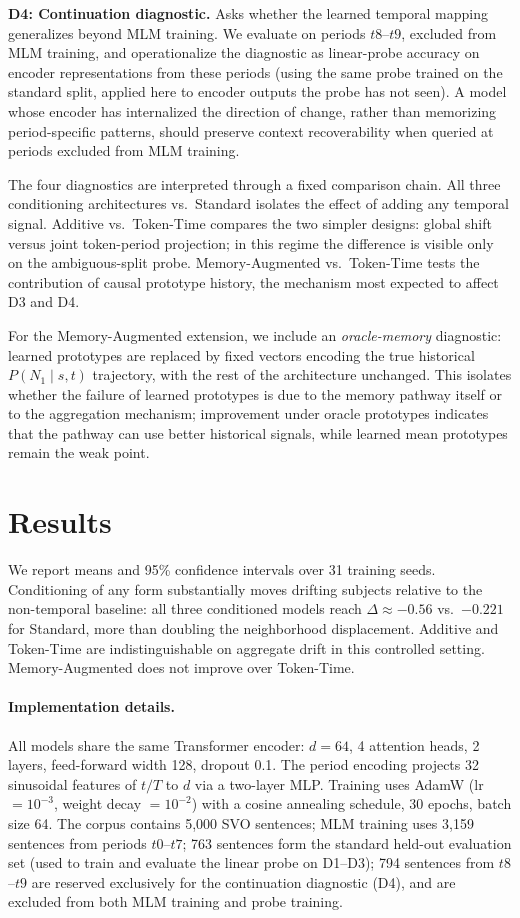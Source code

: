 \documentclass[runningheads]{llncs}
\begin{document}
\textbf{D4: Continuation diagnostic.} Asks whether the learned temporal
mapping generalizes beyond MLM training. We evaluate on periods
\(t8\)--\(t9\), excluded from MLM training, and operationalize the diagnostic as
linear-probe accuracy on encoder representations from these periods (using the
same probe trained on the standard split, applied here to encoder outputs the
probe has not seen). A model whose encoder has internalized the direction of
change, rather than memorizing period-specific patterns, should preserve context
recoverability when queried at periods excluded from MLM training.

The four diagnostics are interpreted through a fixed comparison chain.
All three conditioning architectures vs.\ Standard isolates the effect of
adding any temporal signal. Additive vs.\ Token-Time compares the two simpler
designs: global shift versus joint token-period projection; in this regime the
difference is visible only on the ambiguous-split probe. Memory-Augmented
vs.\ Token-Time tests the contribution of causal prototype history, the
mechanism most expected to affect D3 and D4.

For the Memory-Augmented extension, we include an \textit{oracle-memory}
diagnostic: learned prototypes are replaced by fixed vectors encoding the true
historical \(P(N_1 \mid s,t)\) trajectory, with the rest of the architecture
unchanged. This isolates whether the failure of learned prototypes is due to the
memory pathway itself or to the aggregation mechanism; improvement under oracle
prototypes indicates that the pathway can use better historical signals, while
learned mean prototypes remain the weak point.

\section{Results}
We report means and 95\% confidence intervals over 31 training seeds.
Conditioning of any form substantially moves drifting subjects relative to the
non-temporal baseline: all three conditioned models reach \(\Delta\approx-0.56\)
vs.\ \(-0.221\) for Standard, more than doubling the neighborhood displacement.
Additive and Token-Time are indistinguishable on aggregate drift in this
controlled setting. Memory-Augmented does not improve over Token-Time.

\paragraph{Implementation details.}
All models share the same Transformer encoder: \(d=64\), 4 attention heads, 2
layers, feed-forward width 128, dropout 0.1. The period encoding projects 32
sinusoidal features of \(t/T\) to \(d\) via a two-layer MLP. Training uses
AdamW (lr \(=10^{-3}\), weight decay \(=10^{-2}\)) with a cosine annealing
schedule, 30 epochs, batch size 64. The corpus contains 5{,}000 SVO sentences;
MLM training uses 3{,}159 sentences from periods \(t0\)--\(t7\); 763 sentences
form the standard held-out evaluation set (used to train and evaluate the linear
probe on D1--D3); 794 sentences from \(t8\)--\(t9\) are reserved exclusively
for the continuation diagnostic (D4), and are excluded from both MLM training
and probe training.
\end{document}
